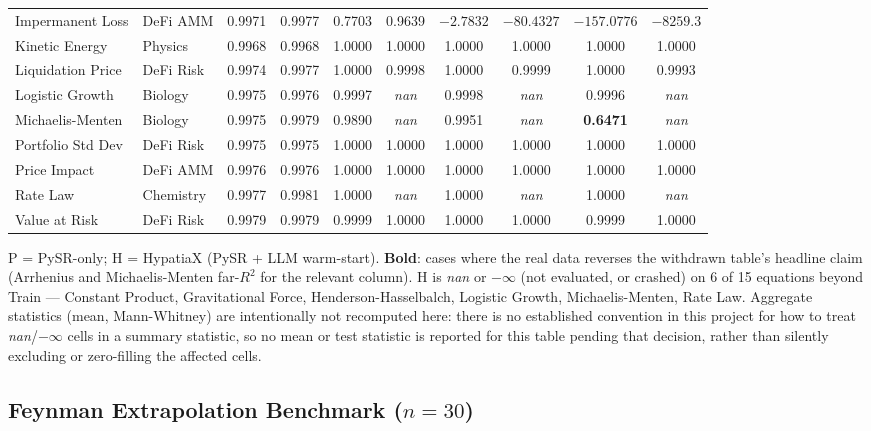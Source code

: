 \documentclass[twoside,11pt]{article}
\begin{document}
\begin{table}[htbp]
{\begin{tabular}{llcccccccc}
Impermanent Loss & DeFi AMM & 0.9971 & 0.9977 & 0.7703 & 0.9639 & $-2.7832$ & $-80.4327$ & $-157.0776$ & $-8259.3$ \\
Kinetic Energy & Physics & 0.9968 & 0.9968 & 1.0000 & 1.0000 & 1.0000 & 1.0000 & 1.0000 & 1.0000 \\
Liquidation Price & DeFi Risk & 0.9974 & 0.9977 & 1.0000 & 0.9998 & 1.0000 & 0.9999 & 1.0000 & 0.9993 \\
Logistic Growth & Biology & 0.9975 & 0.9976 & 0.9997 & \textit{nan} & 0.9998 & \textit{nan} & 0.9996 & \textit{nan} \\
Michaelis-Menten & Biology & 0.9975 & 0.9979 & 0.9890 & \textit{nan} & 0.9951 & \textit{nan} & \textbf{0.6471} & \textit{nan} \\
Portfolio Std Dev & DeFi Risk & 0.9975 & 0.9975 & 1.0000 & 1.0000 & 1.0000 & 1.0000 & 1.0000 & 1.0000 \\
Price Impact & DeFi AMM & 0.9976 & 0.9976 & 1.0000 & 1.0000 & 1.0000 & 1.0000 & 1.0000 & 1.0000 \\
Rate Law & Chemistry & 0.9977 & 0.9981 & 1.0000 & \textit{nan} & 1.0000 & \textit{nan} & 1.0000 & \textit{nan} \\
Value at Risk & DeFi Risk & 0.9979 & 0.9979 & 0.9999 & 1.0000 & 1.0000 & 1.0000 & 0.9999 & 1.0000 \\
\bottomrule
\end{tabular}%
}%
\par\vspace{4pt}
{\footnotesize\noindent
P = PySR-only; H = HypatiaX (PySR + LLM warm-start). \textbf{Bold}: cases
where the real data reverses the withdrawn table's headline claim (Arrhenius
and Michaelis-Menten far-$R^2$ for the relevant column). H is \textit{nan}
or $-\infty$ (not evaluated, or crashed) on 6 of 15 equations beyond Train ---
Constant Product, Gravitational Force, Henderson-Hasselbalch, Logistic
Growth, Michaelis-Menten, Rate Law. Aggregate statistics (mean, Mann-Whitney)
are intentionally not recomputed here: there is no established convention
in this project for how to treat \textit{nan}/$-\infty$ cells in a summary
statistic, so no mean or test statistic is reported for this table pending
that decision, rather than silently excluding or zero-filling the affected
cells.
}
\end{table}

\subsection{Feynman Extrapolation Benchmark ($n=30$)}\label{subsec:feynman-extrapolation-benchmark-n30}
\label{sec:feynman30}
\end{document}
